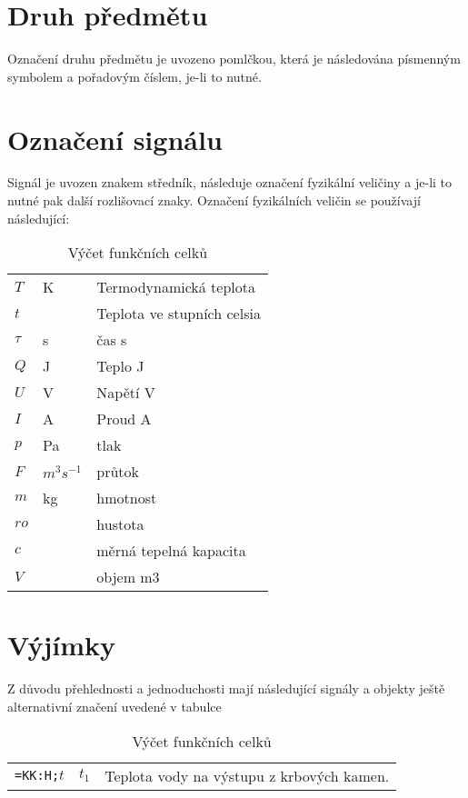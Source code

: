 \documentclass{book}
\begin{document}
\section{Druh předmětu}

    Označení druhu předmětu je uvozeno pomlčkou, která je následována
    písmenným symbolem a pořadovým číslem, je-li to nutné. 

\section{Označení signálu}

    Signál je uvozen znakem středník, následuje označení fyzikální veličiny
    a je-li to nutné pak další rozlišovací znaky. Označení fyzikálních veličin
    se používají následující:

\begin{table}[]
  \centering
    \begin{tabular}{l l l}
$T$ & K & Termodynamická teplota\\
$t$ & & Teplota ve stupních celsia\\ 
$\tau$ & s & čas s\\
$Q$ & J & Teplo J\\
$U$ & V & Napětí V\\
$I$ & A &Proud A\\
$p$ & Pa & tlak\\
$F$ & $m^3 s^{-1}$ & průtok\\
$m$ & kg & hmotnost\\
$ro$ & & hustota\\
$c$ & & měrná tepelná kapacita\\
$V$ & & objem m3\\
    \end{tabular}
  \caption{Výčet funkčních celků}
  \label{tab:myfirsttable}
\end{table}

\section{Výjímky}

    Z důvodu přehlednosti a jednoduchosti mají následující signály a objekty
    ještě alternativní značení uvedené v tabulce

\begin{table}[]
  \centering
    \begin{tabular}{ l l l}
        \texttt{=KK:H;}$t$\index{$t_1$|see {=KK:H;t}} & $t_1$ & Teplota vody na výstupu z krbových kamen.
    \end{tabular}
  \caption{Výčet funkčních celků}
  \label{tab:myfirsttable}
\end{table}
\end{document}
